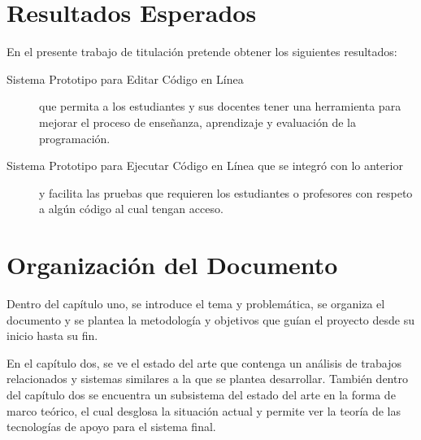\section{Resultados Esperados}
En el presente trabajo de titulación pretende obtener los siguientes resultados:
\begin{description}
	\item[Sistema Prototipo para Editar Código en Línea] que permita a los estudiantes y sus docentes tener una herramienta para mejorar el proceso de enseñanza, aprendizaje y evaluación de la programación.   
 \item[Sistema Prototipo para Ejecutar Código en Línea que se integró con lo anterior] y facilita las pruebas que requieren los estudiantes o profesores con respeto a algún código al cual tengan acceso. 
\end{description}

\section{Organización del Documento}
Dentro del capítulo uno, se introduce el tema y problemática, se organiza el documento y se plantea la metodología y objetivos que guían el proyecto desde su inicio hasta su fin.
 
En el capítulo dos, se ve el estado del arte que contenga un análisis de trabajos relacionados y sistemas similares a la que se plantea desarrollar. También dentro del capítulo dos se encuentra un subsistema del estado del arte en la forma de marco teórico, el cual desglosa la situación actual y permite ver la teoría de las tecnologías de apoyo para el sistema final.
 
